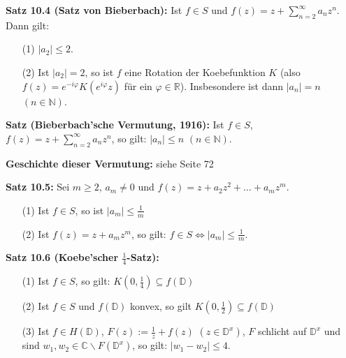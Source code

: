 \documentclass[11pt]{article}
\newcommand{\C}{\mathbb{C}}
\newcommand{\R}{\mathbb{R}}
\newcommand{\N}{\mathbb{N}}
\newcommand{\D}{\mathbb{D}}
\begin{document}
\textbf{Satz 10.4 (Satz von Bieberbach):} Ist $f \in S$ und $f(z) = z + \sum_{n=2}^\infty a_n z^n$. Dann gilt:
\vspace{-0.6cm} 
\begin{itemize}
\item[(1)] $|a_2|  \leq 2$.\vspace{-0.2cm}
\item[(2)] Ist $|a_2| = 2$, so ist $f$ eine Rotation der Koebefunktion $K$ (also $f(z) = e^{-i \varphi} K(e^{i \varphi}z)$ für ein $\varphi \in \R$). Insbesondere ist dann $|a_n| = n$ $(n \in \N)$.
\end{itemize} 
\vspace{-0.3cm}

\textbf{Satz (Bieberbach'sche Vermutung, 1916):} Ist $f \in S$, $f(z) = z + \sum_{n=2}^\infty a_n z^n$, so gilt: $|a_n| \leq n$ $(n \in \N)$.

\textbf{Geschichte dieser Vermutung:} siehe Seite 72

\textbf{Satz 10.5:} Sei $m \geq 2$, $a_m \neq 0$ und $f(z) = z + a_2 z^2 + \dots + a_m z^m$.
\vspace{-0.6cm} 
\begin{itemize}
\item[(1)] Ist $f \in S$, so ist $|a_m| \leq \frac{1}{m}$ \vspace{-0.2cm}
\item[(2)] Ist $f(z) = z + a_mz^m$, so gilt: $f \in S \Leftrightarrow |a_m| \leq \frac{1}{m}$.
\end{itemize} 
\vspace{-0.3cm}

\newpage
\textbf{Satz 10.6 (Koebe'scher $\frac{1}{4}$-Satz):} 
\vspace{-0.6cm} 
\begin{itemize}
\item[(1)] Ist $f \in S$, so gilt: $K(0, \frac{1}{4}) \subseteq f(\D)$ \vspace{-0.2cm}
\item[(2)] Ist $f \in S$ und $f(\D)$ konvex, so gilt $K(0, \frac{1}{2}) \subseteq f(\D)$ \vspace{-0.2cm}
\item[(3)] Ist $f \in H(\D)$, $F(z) := \frac{1}{z} + f(z)$ $(z \in \D^x)$, $F$ schlicht auf $\D^x$ und sind $w_1, w_2 \in \C \backslash F(\D^x)$, so gilt: $|w_1 - w_2| \leq 4$.
\end{itemize} 
\vspace{-0.3cm}
\end{document}
